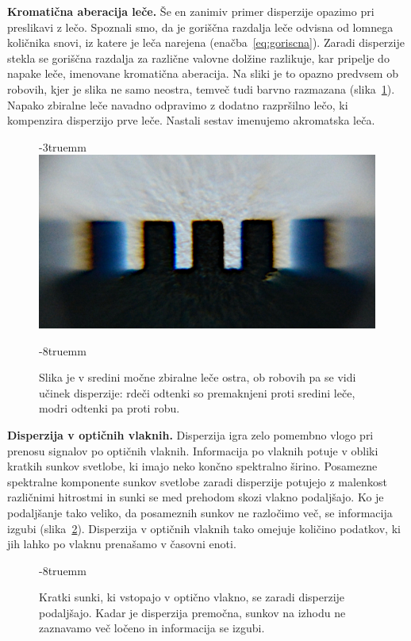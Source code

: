 \begin{example}{\bf Kromatična aberacija leče.} Še en zanimiv primer 
disperzije opazimo pri preslikavi z lečo. 
Spoznali smo, da je goriščna razdalja leče odvisna
od lomnega količnika snovi, iz katere je leča narejena 
(enačba~\ref{eq:goriscna}). Zaradi disperzije stekla
se goriščna razdalja za različne valovne dolžine razlikuje,
kar pripelje do napake leče, imenovane kromatična
aberacija. Na sliki je to opazno predvsem 
ob robovih, kjer je slika ne samo neostra, temveč tudi barvno razmazana (slika~\ref{fig:09_aberacija}). 
Napako zbiralne leče navadno odpravimo z dodatno razpršilno lečo, ki kompenzira
disperzijo prve leče. Nastali sestav imenujemo akromatska leča.
\begin{figure}[ht!]
\vglue-3truemm
\centering
\includegraphics[width=6truecm]{slike/09_aberacija.jpg}
\caption{Slika je v sredini močne zbiralne leče ostra, ob robovih pa
se vidi učinek disperzije: rdeči odtenki so premaknjeni proti sredini 
leče, modri odtenki pa proti robu.}
\label{fig:09_aberacija}
\vglue-8truemm
\end{figure}

\end{example}
\begin{example}{\bf Disperzija v optičnih vlaknih.}
Disperzija igra zelo pomembno vlogo pri prenosu signalov
po optičnih vlaknih. Informacija po vlaknih potuje
v obliki kratkih sunkov svetlobe, ki imajo neko
končno spektralno širino. Posamezne spektralne 
komponente sunkov svetlobe zaradi disperzije 
potujejo z malenkost različnimi hitrostmi in sunki se 
med prehodom skozi vlakno podaljšajo. Ko je podaljšanje
tako veliko, da posameznih sunkov ne razločimo več, 
se informacija izgubi (slika~\ref{fig:09_disperzijafib}).  
Disperzija v optičnih vlaknih tako omejuje količino 
podatkov, ki jih lahko po vlaknu prenašamo v časovni enoti.
\begin{figure}[ht]
\centering
\def\svgwidth{130truemm} 

\caption{Kratki sunki, ki vstopajo v optično vlakno, se zaradi 
disperzije podaljšajo. Kadar je disperzija premočna, sunkov
na izhodu ne zaznavamo več ločeno in informacija se izgubi.}
\label{fig:09_disperzijafib}
\vglue-8truemm
\end{figure}

\end{example}

